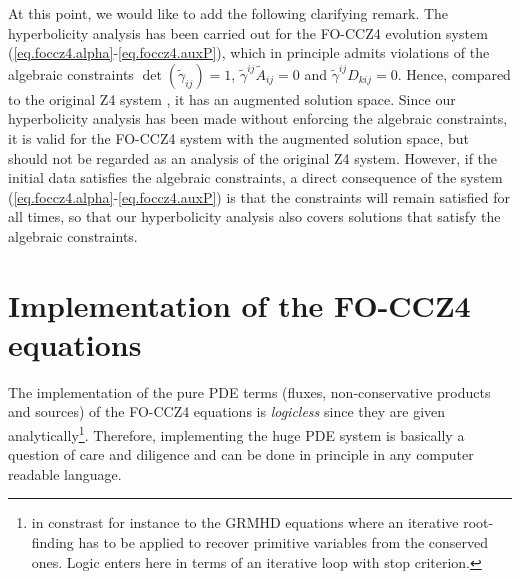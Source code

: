 At this point, we would like to add the following clarifying remark.  The
hyperbolicity analysis has been carried out for the FO-CCZ4 evolution
system (\ref{eq.foccz4.alpha}-\ref{eq.foccz4.auxP}), which in principle 
admits
violations of the algebraic constraints $\det(\tilde{\gamma}_{ij})=1$,
$\tilde{\gamma}^{ij} \tilde{A}_{ij} = 0$ and $\tilde{\gamma}^{ij} D_{kij}
= 0$. Hence, compared to the original Z4 system
\cite{Bona:2003fj,Bona:2003qn,Alic:2009}, it has an augmented solution
space.  Since our hyperbolicity analysis has been made without enforcing
the algebraic constraints, it is valid for the FO-CCZ4 system with the
augmented solution space, but should not be regarded as an analysis of
the original Z4 system. However, if the initial data satisfies the
algebraic constraints, a direct consequence of the system
(\ref{eq.foccz4.alpha}-\ref{eq.foccz4.auxP}) is that the constraints will remain
satisfied for all times, so that our hyperbolicity analysis also covers
solutions that satisfy the algebraic constraints.
%
%

\section{Implementation of the FO-CCZ4 equations}
\label{sec:fo-ccz4-implementations}
The implementation of the pure PDE terms (fluxes, non-conservative
products and sources) of the FO-CCZ4 equations is \emph{logicless}
since they are given analytically\footnote{in constrast for instance to
the GRMHD equations where an iterative root-finding has to be
applied to recover primitive variables from the conserved ones.
Logic enters here in terms of an iterative loop with stop criterion.}.
Therefore, implementing the huge PDE system is basically a question of
care and diligence and can be done in principle in any computer
readable language.

